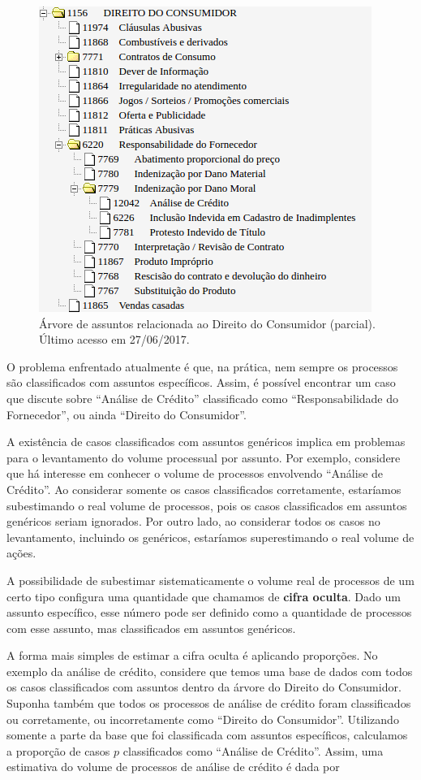 \documentclass[]{report}
\begin{document}
\begin{figure}[htbp]
\centering
\includegraphics{imgs/tpu.png}
\caption{Árvore de assuntos relacionada ao Direito do Consumidor
(parcial). Último acesso em 27/06/2017.}\label{fig:tpu}
\end{figure}

O problema enfrentado atualmente é que, na prática, nem sempre os
processos são classificados com assuntos específicos. Assim, é possível
encontrar um caso que discute sobre ``Análise de Crédito'' classificado
como ``Responsabilidade do Fornecedor'', ou ainda ``Direito do
Consumidor''.

A existência de casos classificados com assuntos genéricos implica em
problemas para o levantamento do volume processual por assunto. Por
exemplo, considere que há interesse em conhecer o volume de processos
envolvendo ``Análise de Crédito''. Ao considerar somente os casos
classificados corretamente, estaríamos subestimando o real volume de
processos, pois os casos classificados em assuntos genéricos seriam
ignorados. Por outro lado, ao considerar todos os casos no levantamento,
incluindo os genéricos, estaríamos superestimando o real volume de
ações.

A possibilidade de subestimar sistematicamente o volume real de
processos de um certo tipo configura uma quantidade que chamamos de
\textbf{cifra oculta}. Dado um assunto específico, esse número pode ser
definido como a quantidade de processos com esse assunto, mas
classificados em assuntos genéricos.

A forma mais simples de estimar a cifra oculta é aplicando proporções.
No exemplo da análise de crédito, considere que temos uma base de dados
com todos os casos classificados com assuntos dentro da árvore do
Direito do Consumidor. Suponha também que todos os processos de análise
de crédito foram classificados ou corretamente, ou incorretamente como
``Direito do Consumidor''. Utilizando somente a parte da base que foi
classificada com assuntos específicos, calculamos a proporção de casos
\(p\) classificados como ``Análise de Crédito''. Assim, uma estimativa
do volume de processos de análise de crédito é dada por
\end{document}
